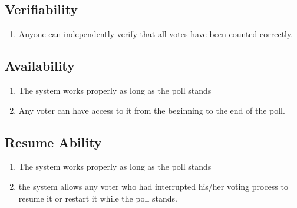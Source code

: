 \subsection{Verifiability}
\begin{enumerate}
\item Anyone can independently verify that all votes have been counted correctly.

\end{enumerate}
\subsection{Availability}
\begin{enumerate}
\item The system works properly as long as the poll stands

\item Any voter can have access to it from the beginning to the end of the poll.

\end{enumerate}
\subsection{Resume Ability}
\begin{enumerate}
\item The system works properly as long as the poll stands

\item the system allows any voter who had interrupted his/her voting process to resume it or restart it
while the poll stands.

\end{enumerate}
